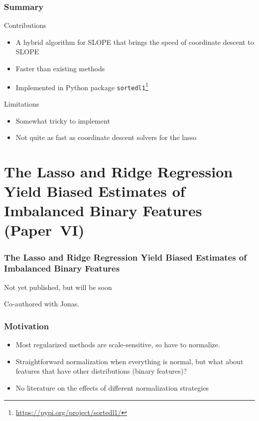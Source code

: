 \documentclass[10pt]{beamer}
\begin{document}
\begin{frame}[c]
  \frametitle{Summary}

  \begin{exampleblock}{Contributions}
    \begin{itemize}
      \item A hybrid algorithm for SLOPE that brings the speed of coordinate descent to SLOPE
      \item Faster than existing methods
      \item Implemented in Python package
            \texttt{sortedl1}\footnote{\url{https://pypi.org/project/sortedl1/}}
    \end{itemize}
  \end{exampleblock}

  \pause

  \begin{alertblock}{Limitations}
    \begin{itemize}
      \item Somewhat tricky to implement
      \item Not quite as fast as coordinate descent solvers for the lasso
    \end{itemize}
  \end{alertblock}
\end{frame}

\section{The Lasso and Ridge Regression Yield Biased Estimates of Imbalanced Binary Features (Paper~VI)}

\begin{frame}[c]
  \frametitle{The Lasso and Ridge Regression Yield Biased Estimates of Imbalanced Binary Features}

  Not yet published, but will be soon\texttrademark

  \bigskip

  Co-authored with Jonas.
\end{frame}

\begin{frame}[c]
  \frametitle{Motivation}

  \begin{itemize}[<+->]
    \item Most regularized methods are scale-sensitive, so have to normalize.
    \item Straightforward normalization when everything is normal, but what about features that have
          other distributions (binary features)?
    \item No literature on the effects of different normalization strategies
  \end{itemize}
\end{frame}
\end{document}
